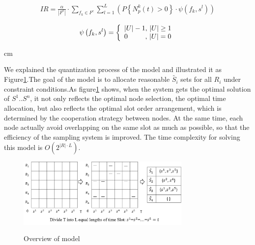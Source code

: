 \documentclass[conference]{IEEEtran}
\begin{document}
\begin{spacing}{0.5}
\begin{small}
\begin{equation}
\begin{split}
IR=\frac{\alpha }{\left| {{F}^{c}} \right|}\cdot \sum\limits_{{{f}_{k}}\in {{F}^{c}}}{\sum\limits_{l=1}^{L\;}{\left( P\left\{ N_{p}^{k}\left( t \right)>0 \right\}\cdot \psi \left( {{f}_{k}},{{s}^{l}} \right) \right)}} \label{ir}
\end{split}
\end{equation}
\end{small}


\begin{small}
\begin{equation}
\psi \left( {{f_k},{s^l}} \right) = \left\{ \begin{array}{l}
\left| U \right| - 1,{\rm{    }}\left| U \right| \ge 1\\
{\rm{   }}0\quad \quad \; \; ,\, \left| U \right| = 0
\end{array} \right.\label{5}
\end{equation}
\end{small}
\end{spacing}
 cm

We explained the quantization process of the model and illustrated it as Figure\ref{fig_1_model}.The goal of the model is to allocate reasonable $\widetilde{{{S}_{i}}}$ sets for all $R_i$ under constraint conditions.As  figure\ref{fig_1_model} shows, when the system gets the optimal solution of $S ^ 1..S ^ n $, it not only reflects the optimal node selection, the optimal time allocation, but also reflects the optimal slot order arrangement, which is determined by the cooperation strategy between nodes. At the same time, each node actually avoid overlapping on the same slot as much as possible, so that the efficiency of the sampling system is improved. The time complexity for solving this model is $O(2^{|R| \cdot L})$.

 

\begin{figure}[!!!!!!!!!!!!!!hhhhhhhhhht]
\centering

\includegraphics[width=8.5cm]{images/slot_num_order.png}
\label{fig_1_slot}

\caption{Overview of model}
\label{fig_1_model}
\end{figure}
\end{document}
